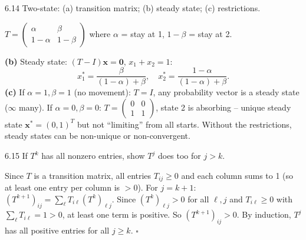\begin{exercise}{6.14}
Two-state: (a) transition matrix; (b) steady state; (c) restrictions.
\end{exercise}
\begin{solution}
$T=\begin{pmatrix}\alpha&\beta\\1-\alpha&1-\beta\end{pmatrix}$ where $\alpha$ = stay at 1, $1-\beta$ = stay at 2.

\textbf{(b)} Steady state: $(T-I)\mathbf{x}=\mathbf{0}$, $x_1+x_2=1$:
\[x_1^*=\frac{\beta}{(1-\alpha)+\beta},\quad x_2^*=\frac{1-\alpha}{(1-\alpha)+\beta}.\]
\textbf{(c)} If $\alpha=1,\beta=1$ (no movement): $T=I$, any probability vector is a steady state ($\infty$ many). If $\alpha=0,\beta=0$: $T=\begin{pmatrix}0&0\\1&1\end{pmatrix}$, state 2 is absorbing -- unique steady state $\mathbf{x}^*=(0,1)^T$ but not ``limiting'' from all starts. Without the restrictions, steady states can be non-unique or non-convergent.
\end{solution}

\begin{exercise}{6.15}
If $T^k$ has all nonzero entries, show $T^j$ does too for $j>k$.
\end{exercise}
\begin{solution}
Since $T$ is a transition matrix, all entries $T_{ij}\geq0$ and each column sums to 1 (so at least one entry per column is $>0$). For $j=k+1$: $(T^{k+1})_{ij}=\sum_\ell T_{i\ell}(T^k)_{\ell j}$. Since $(T^k)_{\ell j}>0$ for all $\ell,j$ and $T_{i\ell}\geq0$ with $\sum_\ell T_{i\ell}=1>0$, at least one term is positive. So $(T^{k+1})_{ij}>0$. By induction, $T^j$ has all positive entries for all $j\geq k$. $\square$
\end{solution}
